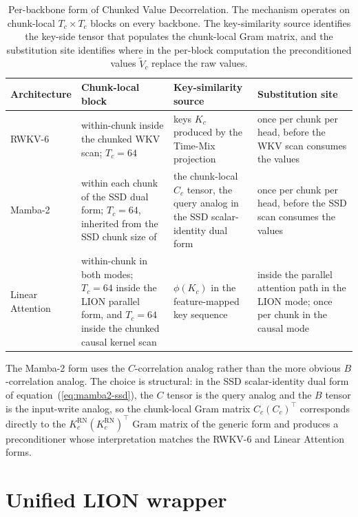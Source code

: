 \begin{table}[t]
\centering
\small
\caption[Per-backbone form of Chunked Value
Decorrelation]{Per-backbone form of Chunked Value
Decorrelation. The mechanism operates on chunk-local
$T_{c} \times T_{c}$ blocks on every backbone. The
key-similarity source identifies the key-side tensor that
populates the chunk-local Gram matrix, and the substitution site
identifies where in the per-block computation the preconditioned
values $\tilde{V}_{c}$ replace the raw values.}
\label{tab:cvd-deployment}
\setlength{\tabcolsep}{4pt}
\renewcommand{\arraystretch}{1.25}
\begin{tabularx}{\linewidth}{@{}p{2.4cm} X X X@{}}
\toprule
\textbf{Architecture} & \textbf{Chunk-local block} & \textbf{Key-similarity source} & \textbf{Substitution site} \\
\midrule
RWKV-6 &
within-chunk inside the chunked WKV scan; $T_{c} = 64$ &
keys $K_{c}$ produced by the Time-Mix projection &
once per chunk per head, before the WKV scan consumes the values \\
\addlinespace
Mamba-2 &
within each chunk of the SSD dual form; $T_{c} = 64$, inherited from the SSD chunk size of~\citet{dao2024transformers} &
the chunk-local $C_{c}$ tensor, the query analog in the SSD scalar-identity dual form &
once per chunk per head, before the SSD scan consumes the values \\
\addlinespace
\shortstack[l]{Linear\\Attention} &
within-chunk in both modes; $T_{c} = 64$ inside the LION parallel form, and $T_{c} = 64$ inside the chunked causal kernel scan &
$\phi(K_{c})$ in the feature-mapped key sequence &
inside the parallel attention path in the LION mode; once per chunk in the causal mode \\
\bottomrule
\end{tabularx}
\end{table}

The Mamba-2 form uses the $C$-correlation analog rather than the
more obvious $B$-correlation analog. The choice is structural: in
the SSD scalar-identity dual form of
equation~(\ref{eq:mamba2-ssd}), the $C$ tensor is the query analog
and the $B$ tensor is the input-write analog, so the chunk-local
Gram matrix $C_{c} (C_{c})^{\top}$ corresponds directly to the
$K_{c}^{\mathrm{RN}} (K_{c}^{\mathrm{RN}})^{\top}$ Gram matrix of
the generic form and produces a preconditioner whose
interpretation matches the RWKV-6 and Linear Attention forms.

\section{Unified LION wrapper}\label{sec:proposed:lion}

